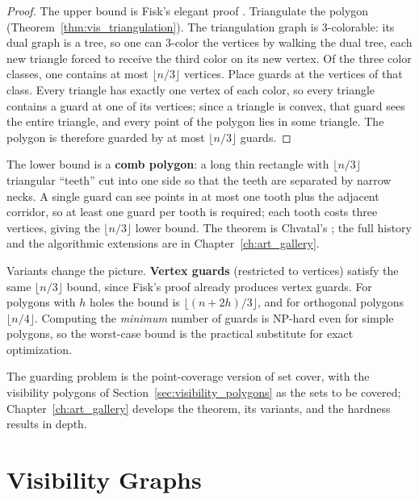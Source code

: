 \begin{proof}
  The upper bound is Fisk's elegant proof \cite{fisk1978}. Triangulate the
  polygon (Theorem~\ref{thm:vis_triangulation}). The triangulation graph is
  3-colorable: its dual graph is a tree, so one can 3-color the vertices by
  walking the dual tree, each new triangle forced to receive the third color
  on its new vertex. Of the three color classes, one contains at most
  $\lfloor n/3 \rfloor$ vertices. Place guards at the vertices of that
  class. Every triangle has exactly one vertex of each color, so every
  triangle contains a guard at one of its vertices; since a triangle is
  convex, that guard sees the entire triangle, and every point of the
  polygon lies in some triangle. The polygon is therefore guarded by at most
  $\lfloor n/3 \rfloor$ guards.
\end{proof}

The lower bound is a \textbf{comb polygon}: a long thin
rectangle with $\lfloor n/3 \rfloor$ triangular ``teeth'' cut into one side
so that the teeth are separated by narrow necks. A single guard can see
points in at most one tooth plus the adjacent corridor, so at least one
guard per tooth is required; each tooth costs three vertices, giving the
$\lfloor n/3 \rfloor$ lower bound. The theorem is Chvatal's
\cite{chvatal1975}; the full history and the algorithmic extensions are in
Chapter~\ref{ch:art_gallery}.

\begin{remark}\label{rem:vis_guarding_variants}
  Variants change the picture. \textbf{Vertex guards} (restricted to
  vertices) satisfy the same $\lfloor n/3 \rfloor$ bound, since Fisk's proof
  already produces vertex guards. For polygons with $h$ holes the bound is
  $\lfloor (n + 2h)/3 \rfloor$, and for orthogonal polygons $\lfloor n/4
  \rfloor$. Computing the \emph{minimum} number of guards is NP-hard even
  for simple polygons, so the worst-case bound is the practical substitute
  for exact optimization.
\end{remark}

The guarding problem is the point-coverage version of set cover, with the
visibility polygons of Section~\ref{sec:visibility_polygons} as the sets to
be covered; Chapter~\ref{ch:art_gallery} develops the theorem, its variants,
and the hardness results in depth.


\section{Visibility Graphs}
\label{sec:visibility_graphs}

